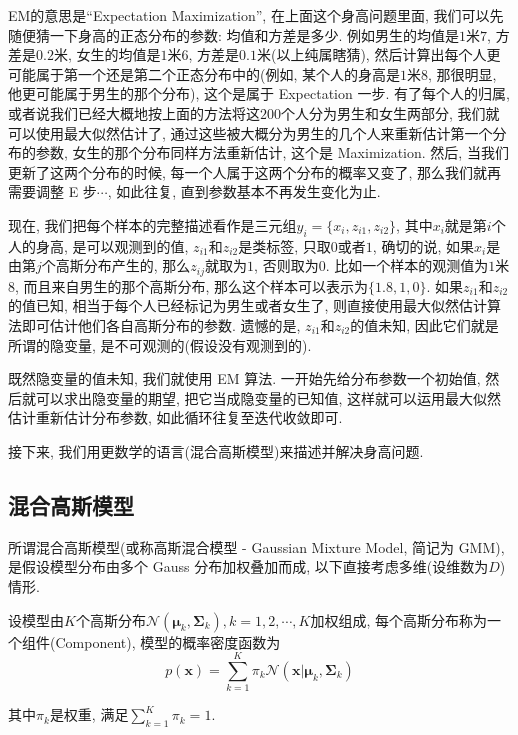 \documentclass[a4paper,UTF8]{ctexart}
\theoremstyle{plain} \newtheorem{theorem}{定理}[section]
\theoremstyle{plain} \newtheorem{definition}{定义}[section]
\theoremstyle{plain} \newtheorem{lemma}{引理}[section]
\theoremstyle{plain} \newtheorem{proposition}{命题}[section]
\theoremstyle{plain} \newtheorem{example}{例}
\theoremstyle{plain} \newtheorem{remark}{注}
\theoremstyle{plain} \newtheorem{corollary}{推论}[section]
\begin{document}
EM的意思是“Expectation Maximization”, 在上面这个身高问题里面, 我们可以先随便猜一下身高的正态分布的参数: 均值和方差是多少. 例如男生的均值是$1$米$7$, 方差是$0.2$米, 女生的均值是$1$米$6$, 方差是$0.1$米(以上纯属瞎猜), 然后计算出每个人更可能属于第一个还是第二个正态分布中的(例如, 某个人的身高是$1$米$8$, 那很明显, 他更可能属于男生的那个分布), 这个是属于 Expectation 一步. 有了每个人的归属, 或者说我们已经大概地按上面的方法将这$200$个人分为男生和女生两部分, 我们就可以使用最大似然估计了, 通过这些被大概分为男生的几个人来重新估计第一个分布的参数, 女生的那个分布同样方法重新估计, 这个是 Maximization. 然后, 当我们更新了这两个分布的时候, 每一个人属于这两个分布的概率又变了, 那么我们就再需要调整 E 步$\cdots$, 如此往复, 直到参数基本不再发生变化为止.

现在, 我们把每个样本的完整描述看作是三元组$y_{i} = \{ x_{i}, z_{i1}, z_{i2} \}$, 其中$x_{i}$就是第$i$个人的身高, 是可以观测到的值, $z_{i1}$和$z_{i2}$是类标签, 只取$0$或者$1$, 确切的说, 如果$x_{i}$是由第$j$个高斯分布产生的, 那么$z_{ij}$就取为$1$, 否则取为$0$. 比如一个样本的观测值为$1$米$8$, 而且来自男生的那个高斯分布, 那么这个样本可以表示为$\{ 1.8, 1, 0 \}$. 如果$z_{i1}$和$z_{i2}$的值已知, 相当于每个人已经标记为男生或者女生了, 则直接使用最大似然估计算法即可估计他们各自高斯分布的参数. 遗憾的是, $z_{i1}$和$z_{i2}$的值未知, 因此它们就是所谓的隐变量, 是不可观测的(假设没有观测到的).

{\color{red}既然隐变量的值未知, 我们就使用 EM 算法. 一开始先给分布参数一个初始值, 然后就可以求出隐变量的期望, 把它当成隐变量的已知值, 这样就可以运用最大似然估计重新估计分布参数, 如此循环往复至迭代收敛即可}.

接下来, 我们用更数学的语言(混合高斯模型)来描述并解决身高问题.


\subsection{混合高斯模型}
所谓混合高斯模型(或称高斯混合模型 - Gaussian Mixture Model, 简记为 GMM),是假设模型分布由多个 Gauss 分布加权叠加而成, 以下直接考虑多维(设维数为$D$)情形.

设模型由$K$个高斯分布$\mathcal{N}(\bm{\mu}_{k},\bm{\Sigma}_{k}), k = 1,2,\cdots,K$加权组成, 每个高斯分布称为一个组件(Component), 模型的概率密度函数为
\begin{equation*}
p(\bm{x}) = \sum_{k=1}^{K} \pi_{k} \mathcal{N}(\bm{x} | \bm{\mu}_{k},\bm{\Sigma}_{k})
\end{equation*}

其中$\pi_{k}$是权重, 满足$\sum\limits_{k=1}^{K} \pi_{k} = 1$.
\end{document}
